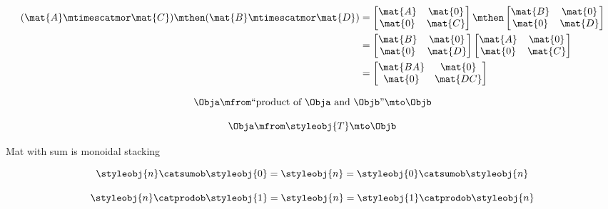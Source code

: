 \begin{forslides}
    \begin{align}\label{eq:parallelism-057}
        (\mat{A} \mtimescatmor \mat{C}) \mthen (\mat{B} \mtimescatmor \mat{D}) & =
        \begin{bmatrix}
            \mat{A} & \mat{0} \\
            \mat{0} & \mat{C}
        \end{bmatrix}
        \mthen
        \begin{bmatrix}
            \mat{B} & \mat{0} \\
            \mat{0} & \mat{D}
        \end{bmatrix} \\
                                                                               & =
        \begin{bmatrix}
            \mat{B} & \mat{0} \\
            \mat{0} & \mat{D}
        \end{bmatrix}
        \begin{bmatrix}
            \mat{A} & \mat{0} \\
            \mat{0} & \mat{C}
        \end{bmatrix} \\
                                                                               & =
        \begin{bmatrix}
            \mat{BA} & \mat{0}  \\
            \mat{0}  & \mat{DC}
        \end{bmatrix}
    \end{align}

    \begin{equation}
        \label{eq:parallelism-058}
        \Obja \mfrom \text{``product of } \Obja \text{ and } \Objb \text{''} \mto \Objb
    \end{equation}

    \begin{equation}
        \label{eq:parallelism-059}
        \Obja \mfrom \styleobj{T} \mto \Objb
    \end{equation}

    Mat with sum is monoidal stacking

    \begin{equation}
        \label{eq:parallelism-060}
        \styleobj{n} \catsumob \styleobj{0} = \styleobj{n} = \styleobj{0} \catsumob \styleobj{n}
    \end{equation}

    \begin{equation}
        \label{eq:parallelism-061}
        \styleobj{n} \catprodob \styleobj{1} = \styleobj{n} = \styleobj{1} \catprodob \styleobj{n}
    \end{equation}


\end{forslides}
